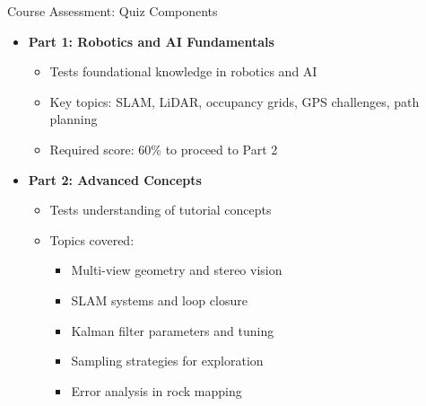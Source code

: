 \documentclass[aspectratio=169]{beamer}
\begin{document}
\begin{frame}{Course Assessment: Quiz Components}
\begin{itemize}
    \item \textbf{Part 1: Robotics and AI Fundamentals}
    \begin{itemize}
        \item Tests foundational knowledge in robotics and AI
        \item Key topics: SLAM, LiDAR, occupancy grids, GPS challenges, path planning
        \item Required score: 60\% to proceed to Part 2
    \end{itemize}
    \item \textbf{Part 2: Advanced Concepts}
    \begin{itemize}
        \item Tests understanding of tutorial concepts
        \item Topics covered:
        \begin{itemize}
            \item Multi-view geometry and stereo vision
            \item SLAM systems and loop closure
            \item Kalman filter parameters and tuning
            \item Sampling strategies for exploration
            \item Error analysis in rock mapping
        \end{itemize}
    \end{itemize}
\end{itemize}
\end{frame}
\end{document}
